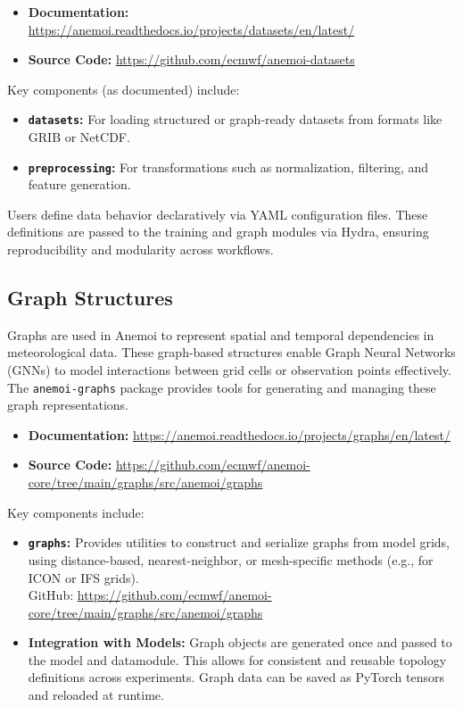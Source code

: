\begin{itemize}
  \item {\bf Documentation:} \url{https://anemoi.readthedocs.io/projects/datasets/en/latest/}
  \item {\bf Source Code:} \url{https://github.com/ecmwf/anemoi-datasets}
\end{itemize}

Key components (as documented) include:

\begin{itemize}
  \item {\bf \texttt{datasets}:} For loading structured or graph-ready datasets from formats like GRIB or NetCDF.
  \item {\bf \texttt{preprocessing}:} For transformations such as normalization, filtering, and feature generation.
\end{itemize}

Users define data behavior declaratively via YAML configuration files. These definitions are passed to the training and graph modules via Hydra, ensuring reproducibility and modularity across workflows.


%
\subsection{Graph Structures}

Graphs are used in Anemoi to represent spatial and temporal dependencies in meteorological data. These graph-based structures enable Graph Neural Networks (GNNs) to model interactions between grid cells or observation points effectively. The \texttt{anemoi-graphs} package provides tools for generating and managing these graph representations.

\begin{itemize}
  \item {\bf Documentation:} \url{https://anemoi.readthedocs.io/projects/graphs/en/latest/}
  \item {\bf Source Code:} \url{https://github.com/ecmwf/anemoi-core/tree/main/graphs/src/anemoi/graphs}
\end{itemize}

Key components include:

\begin{itemize}
  \item {\bf \texttt{graphs}:} Provides utilities to construct and serialize graphs from model grids, using distance-based, nearest-neighbor, or mesh-specific methods (e.g., for ICON or IFS grids).\\
  GitHub: \url{https://github.com/ecmwf/anemoi-core/tree/main/graphs/src/anemoi/graphs}
  
  \item {\bf Integration with Models:} Graph objects are generated once and passed to the model and datamodule. This allows for consistent and reusable topology definitions across experiments. Graph data can be saved as PyTorch tensors and reloaded at runtime.
\end{itemize}


